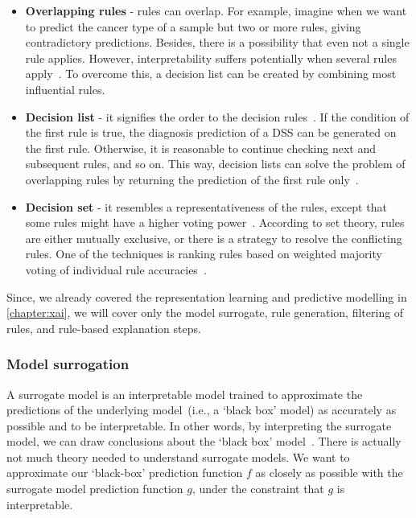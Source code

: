 \begin{itemize}[noitemsep]
    \item \textbf{Overlapping rules} - rules can overlap. For example, imagine when we want to predict the cancer type of a sample but two or more rules, giving contradictory predictions. Besides, there is a possibility that even not a single rule applies. However, interpretability suffers potentially when several rules apply~\cite{molnar2019interpretable}. To overcome this, a decision list can be created by combining most influential rules. 
    \item \textbf{Decision list} - it signifies the order to the decision rules~\cite{molnar2019interpretable}. If the condition of the first rule is true, the diagnosis prediction of a DSS can be generated on the first rule. Otherwise, it is reasonable to continue checking next and subsequent rules, and so on. This way, decision lists can solve the problem of overlapping rules by returning the prediction of the first rule only~\cite{molnar2019interpretable}. 
    \item \textbf{Decision set} - it resembles a representativeness of the rules, except that some rules might have a higher voting power~\cite{molnar2019interpretable}. According to set theory, rules are either mutually exclusive, or there is a strategy to resolve the conflicting rules. One of the techniques is ranking rules based on weighted majority voting of individual rule accuracies~\cite{molnar2019interpretable}. 
\end{itemize}

\hspace*{3.5mm} Since, we already covered the representation learning and predictive modelling in \cref{chapter:xai}, we will cover only the model surrogate, rule generation, filtering of rules, and rule-based explanation steps. 

\subsubsection{Model surrogation}
A surrogate model is an interpretable model trained to approximate the predictions of the underlying model~(i.e., a `black box' model) as accurately as possible and to be interpretable. In other words, by interpreting the surrogate model, we can draw conclusions about the `black box' model~\cite{molnar2019interpretable}. There is actually not much theory needed to understand surrogate models. We want to approximate our `black-box' prediction function $f$ as closely as possible with the surrogate model prediction function $g$, under the constraint that $g$ is interpretable. 

